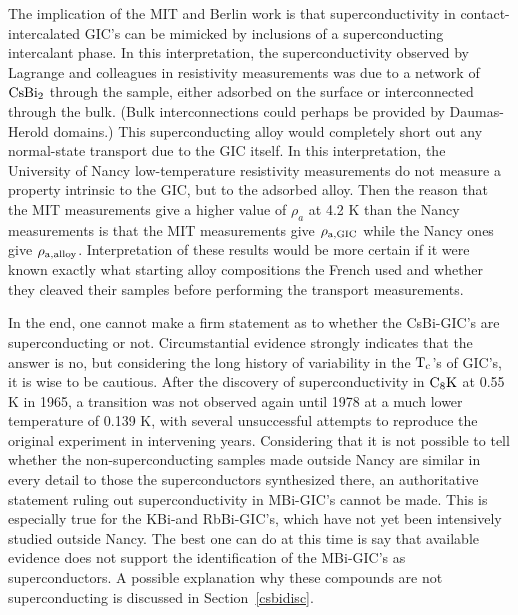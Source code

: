 	The implication of the  MIT and Berlin work\cite{stang88}   is that
superconductivity  in   contact-intercalated    GIC's   can be  mimicked by
inclusions of a superconducting intercalant phase.  In this interpretation,
the superconductivity observed  by Lagrange and  colleagues in  resistivity
measurements was   due to a network  of  $\rm CsBi_2$ through  the  sample,
either adsorbed on the surface  or interconnected through the bulk.   (Bulk
interconnections could perhaps be provided by Daumas-Herold domains.)  This
superconducting alloy would completely short out any normal-state transport
due  to the GIC itself.   In  this interpretation,  the University of Nancy
low-temperature   resistivity measurements do    not  measure   a  property
intrinsic to the GIC, but to the adsorbed alloy.  Then  the reason that the
MIT measurements  give a higher  value of $\rho_a$ at  4.2 K than the Nancy
measurements is that  the MIT measurements  give $\rm \rho_{a, GIC}$  while
the Nancy ones give $\rm \rho_{a, alloy}$.  Interpretation of these results
would be  more  certain  if it   were known  exactly what   starting  alloy
compositions the French used and whether they  cleaved their samples before
performing the transport measurements.

	In the end, one cannot  make  a firm statement   as to whether  the
CsBi-GIC's are  superconducting or  not.  Circumstantial  evidence strongly
indicates that  the  answer is no,   but considering   the long  history of
variability in the $\rm T_c$'s of GIC's, it is wise to  be cautious.  After
the discovery  of superconductivity in  $\rm  C_8K$ at  0.55 K  in  1965, a
transition was not observed again until 1978 at a much lower temperature of
0.139 K,\cite{koike78} with several unsuccessful attempts to  reproduce the
original experiment  in intervening  years.\cite{poitrenaud70}  Considering
that it is  not possible to   tell whether the  non-superconducting samples
made outside Nancy are similar in every detail to those the superconductors
synthesized there,  an authoritative statement ruling out superconductivity
in  MBi-GIC's cannot  be  made.  This is   especially true for  the KBi-and
RbBi-GIC's, which have not yet been intensively studied outside Nancy.  The
best one can do  at this time  is  say  that  available evidence   does not
support the identification of the MBi-GIC's as superconductors.  A possible
explanation why these compounds are not superconducting is discussed in Section~\ref{csbidisc}.
